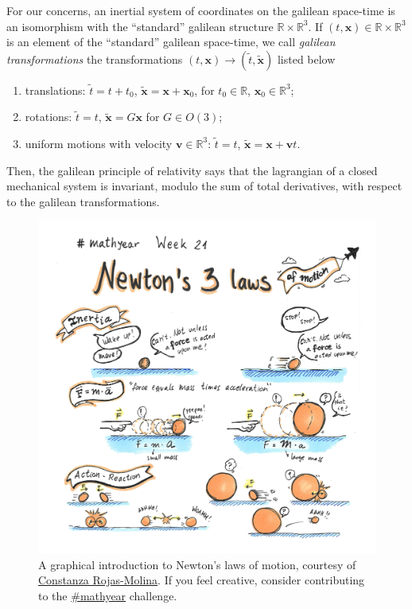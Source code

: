 \documentclass[english,fontsize=11pt,paper=a5,oneside]{scrbook}
\newcommand{\R}{\mathbb{R}}
\newcommand{\bx}{\bm{x}}
\theoremstyle{definition}
\begin{document}
For our concerns, an inertial system of coordinates on the galilean space-time is an isomorphism with the ``standard'' galilean structure $\R\times\R^3$.
If $(t, \bx) \in \R\times \R^3$ is an element of the ``standard'' galilean space-time, we call \emph{galilean transformations} the transformations $(t,\bx) \to (\widetilde t, \widetilde{\bx})$ listed below
\begin{enumerate}
  \item translations: $\widetilde t = t + t_0$, $\widetilde{\bx} = \bx + \bx_0$, for $t_0\in\R$, $\bx_0\in\R^3$;
  \item rotations: $\widetilde t = t$, $\widetilde{\bx} = G\bx$ for $G\in O(3)$;
  \item uniform motions with velocity $\bm{v}\in\R^3$: $\widetilde t = t$, $\widetilde{\bx} = \bx + \bm{v} t$.
\end{enumerate}
Then, the galilean principle of relativity says that the lagrangian of a closed mechanical system is invariant, modulo the sum of total derivatives, with respect to the galilean transformations.

\begin{figure}[ht]
  \centering
  \includegraphics[width=.85\linewidth]{coni-mathyear-21-21.jpg}
  \caption{A graphical introduction to Newton's laws of motion,
    courtesy of \href{https://web.archive.org/web/20210602092955/https://twitter.com/Coni777/status/1399953219997032448}{Constanza Rojas-Molina}.
    If you feel creative, consider contributing to the
    \href{http://crojasmolina.com/illustration/the-mathyear-challenge/list-of-prompts-for-mathyear/}{\#mathyear} challenge.}
\end{figure}
\end{document}
